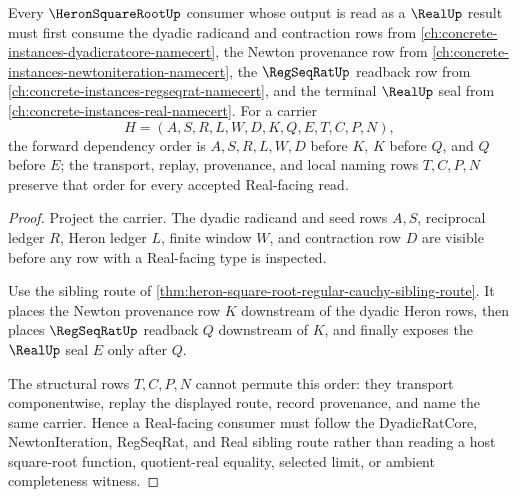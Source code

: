 \begin{theorem}
\label{thm:heron-square-root-dyadic-real-forward-link}
Every $\HeronSquareRootUp$ consumer whose output is read as a $\RealUp$ result must first consume the dyadic radicand and contraction rows from \autoref{ch:concrete-instances-dyadicratcore-namecert}, the Newton provenance row from \autoref{ch:concrete-instances-newtoniteration-namecert}, the $\RegSeqRatUp$ readback row from \autoref{ch:concrete-instances-regseqrat-namecert}, and the terminal $\RealUp$ seal from \autoref{ch:concrete-instances-real-namecert}. For a carrier
$$
H=(A,S,R,L,W,D,K,Q,E,T,C,P,N),
$$
the forward dependency order is $A,S,R,L,W,D$ before $K$, $K$ before $Q$, and $Q$ before $E$; the transport, replay, provenance, and local naming rows $T,C,P,N$ preserve that order for every accepted Real-facing read.
\end{theorem}
\begin{proof}
Project the carrier. The dyadic radicand and seed rows $A,S$, reciprocal ledger $R$, Heron ledger $L$, finite window $W$, and contraction row $D$ are visible before any row with a Real-facing type is inspected.

Use the sibling route of \autoref{thm:heron-square-root-regular-cauchy-sibling-route}. It places the Newton provenance row $K$ downstream of the dyadic Heron rows, then places $\RegSeqRatUp$ readback $Q$ downstream of $K$, and finally exposes the $\RealUp$ seal $E$ only after $Q$.

The structural rows $T,C,P,N$ cannot permute this order: they transport componentwise, replay the displayed route, record provenance, and name the same carrier. Hence a Real-facing consumer must follow the DyadicRatCore, NewtonIteration, RegSeqRat, and Real sibling route rather than reading a host square-root function, quotient-real equality, selected limit, or ambient completeness witness.
\end{proof}

